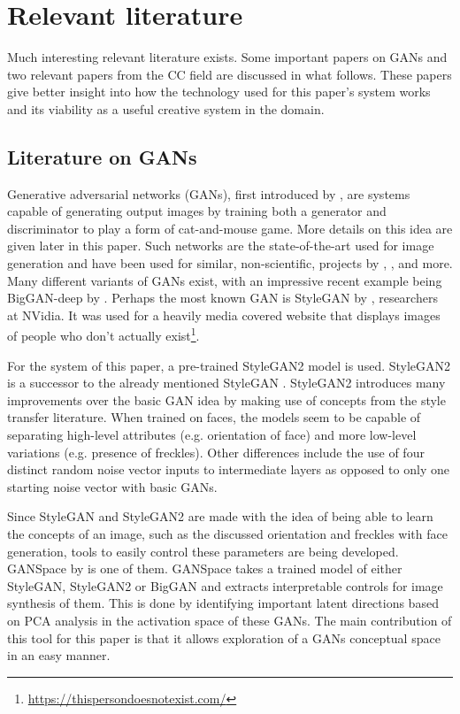 \section{Relevant literature}
\label{sec:relevant_literature}

Much interesting relevant literature exists.
Some important papers on GANs and two relevant papers from the CC field are discussed in what follows.
These papers give better insight into how the technology used for this paper's system works and its viability as a useful creative system in the domain.

\subsection{Literature on GANs}
\label{subsec:relevant_literature_gan}

Generative adversarial networks (GANs), first introduced by \citet{gan_founder}, are systems capable of generating output images by training both a generator and discriminator to play a form of cat-and-mouse game.
More details on this idea are given later in this paper.
Such networks are the state-of-the-art used for image generation and have been used for similar, non-scientific, projects by \citet{gancar1}, \citet{gancar2}, \citet{gancar3} and more.
Many different variants of GANs exist, with an impressive recent example being BigGAN-deep by \citet{biggan}.
Perhaps the most known GAN is StyleGAN by \citet{stylegan}, researchers at NVidia.
It was used for a heavily media covered website that displays images of people who don't actually exist\footnote{\url{https://thispersondoesnotexist.com/}}.

For the system of this paper, a pre-trained StyleGAN2 model is used.
StyleGAN2 is a successor to the already mentioned StyleGAN \citep{stylegan2}.
StyleGAN2 introduces many improvements over the basic GAN idea by making use of concepts from the style transfer literature.
When trained on faces, the models seem to be capable of separating high-level attributes (e.g. orientation of face) and more low-level variations (e.g. presence of freckles).
Other differences include the use of four distinct random noise vector inputs to intermediate layers as opposed to only one starting noise vector with basic GANs.

Since StyleGAN and StyleGAN2 are made with the idea of being able to learn the concepts of an image, such as the discussed orientation and freckles with face generation, tools to easily control these parameters are being developed.
GANSpace by \citet{ganspace} is one of them.
GANSpace takes a trained model of either StyleGAN, StyleGAN2 or BigGAN and extracts interpretable controls for image synthesis of them.
This is done by identifying important latent directions based on PCA analysis in the activation space of these GANs.
The main contribution of this tool for this paper is that it allows exploration of a GANs conceptual space in an easy manner.


